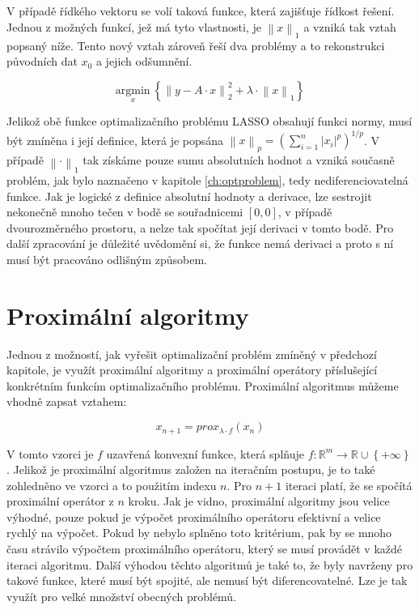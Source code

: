 \documentclass[FM,BP]{tulthesis}
\newcounter{Vzorce}
\begin{document}
V případě řídkého vektoru se volí taková funkce, která zajišťuje řídkost řešení. Jednou z možných funkcí, jež má tyto vlastnosti, je $\left\|x\right\|_1$ a vzniká tak vztah popsaný níže. Tento nový vztah zároveň řeší dva problémy a to rekonstrukci původních dat $x_0$ a jejich odšumnění.

\begin{equation} \label{eq:Konkretni LASSO} \tag{Vzorec \theVzorce}
\underset{x} {\mathrm{argmin}} ~\left\{\left\|y-A \cdot x\right\| ^2 _2+ \lambda \cdot \left\|x\right\|_1\right\}
\end{equation}

Jelikož obě funkce optimalizačního problému LASSO obsahují funkci normy, musí být zmíněna i její definice, která je popsána $\left\|x\right\|_p = \left(\sum_{i=1}^{n} \left|x_i\right|^p\right)^{1/p}$. V případě $\left\| \cdot \right\|_{1} $ tak získáme pouze sumu absolutních hodnot a vzniká současně problém, jak bylo naznačeno v kapitole \ref{ch:optproblem}, tedy nediferenciovatelná funkce. Jak je logické z definice absolutní hodnoty a derivace, lze sestrojit nekonečně mnoho tečen v bodě se souřadnicemi $[0, 0]$, v případě dvourozměrného prostoru, a nelze tak spočítat její derivaci v tomto bodě. Pro další zpracování je důležité uvědomění si, že funkce nemá derivaci a proto s ní musí být pracováno odlišným způsobem.

\chapter{Proximální algoritmy}
\label{ch:proxalg}
Jednou z možností, jak vyřešit optimalizační problém zmíněný v předchozí kapitole, je využít proximální algoritmy a proximální operátory příslušející konkrétním funkcím optimalizačního problému. Proximální algoritmus můžeme vhodně zapsat vztahem:

\begin{equation} \label{eq:proxAlg} \tag{Vzorec \theVzorce}
x_{n+1} = prox_{\lambda \cdot f}(x_{n})
\end{equation}

V tomto vzorci je $f$ uzavřená konvexní funkce, která splňuje $f : \mathbb{R}^{m} \rightarrow \mathbb{R} \cup \left\{+\infty\right\}$. Jelikož je proximální algoritmus založen na iteračním postupu, je to také zohledněno ve vzorci a to použitím indexu $n$. Pro $n+1$ iteraci platí, že se spočítá proximální operátor z $n$ kroku. Jak je vidno, proximální algoritmy jsou velice výhodné, pouze pokud je výpočet proximálního operátoru efektivní a velice rychlý na výpočet. Pokud by nebylo splněno toto kritérium, pak by se mnoho času strávilo výpočtem proximálního operátoru, který se musí provádět v každé iteraci algoritmu. Další výhodou těchto algoritmů je také to, že byly navrženy pro takové funkce, které musí být spojité, ale nemusí být diferencovatelné. Lze je tak využít pro velké množství obecných problémů.
\end{document}
